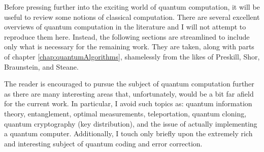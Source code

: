Before pressing further into the exciting world of quantum computation, 
it will be useful to review some notions of classical computation.
There are several excellent overviews of quantum computation in the literature
\cite{Preskill:98,Shor:00,Braunstein:96,Steane:97,Lo/Popescu/Spiller:00,
Deutsch/Ekert/Lupacchini:99,Preskill:96}
and I will not attempt to reproduce them here.  Instead, the following
sections are streamlined to include only what is necessary for the remaining
work.  They are taken, along with parts of chapter \ref{chap:quantumAlgorithms}, 
shamelessly from the likes of Preskill\cite{Preskill:98}, Shor\cite{Shor:00}, 
Braunstein\cite{Braunstein:96}, and Steane\cite{Steane:97}.

The reader is encouraged to pursue the subject of quantum computation 
further as there are many interesting
areas that, unfortunately, would be a bit far afield for the current work.
In particular, I avoid such topics as: quantum information theory, 
entanglement, optimal measurements, teleportation, quantum cloning,
quantum cryptography (key distribution), and the issue of actually 
implementing a quantum computer.
Additionally, I touch only briefly upon the extremely rich and interesting
subject of quantum coding and error correction.  





